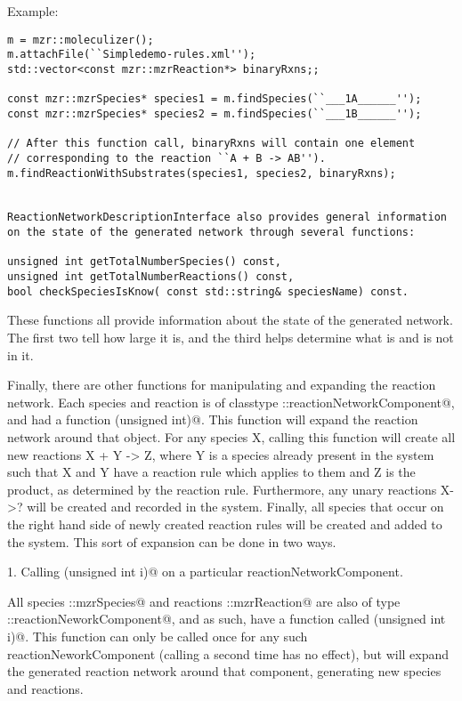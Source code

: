 Example:
\begin{lstlisting}
m = mzr::moleculizer();
m.attachFile(``Simpledemo-rules.xml'');
std::vector<const mzr::mzrReaction*> binaryRxns;;

const mzr::mzrSpecies* species1 = m.findSpecies(``___1A______'');
const mzr::mzrSpecies* species2 = m.findSpecies(``___1B______'');

// After this function call, binaryRxns will contain one element
// corresponding to the reaction ``A + B -> AB'').
m.findReactionWithSubstrates(species1, species2, binaryRxns);


ReactionNetworkDescriptionInterface also provides general information
on the state of the generated network through several functions:

unsigned int getTotalNumberSpecies() const, 
unsigned int getTotalNumberReactions() const,
bool checkSpeciesIsKnow( const std::string& speciesName) const.
\end{lstlisting}

These functions all provide information about the state of the
generated network.  The first two tell how large it is, and the third
helps determine what is and is not in it.  

Finally, there are other functions for manipulating and expanding the
reaction network.  Each species and reaction is of classtype
\lstinline@fnd::reactionNetworkComponent@, and had a function
\lstinline@expandReactionNetwork(unsigned int)@.  This function will expand the
reaction network around that object.  For any species X, calling this
function will create all new reactions X + Y -> Z, where Y is a species
already present in the system such that X and Y have a reaction rule
which applies to them and Z is the product, as determined by the
reaction rule.  Furthermore, any unary reactions X->? will be created
and recorded in the system.  Finally, all species that occur on the
right hand side of newly created reaction rules will be created and
added to the system.  This sort of expansion can be done in two ways.

1.  Calling \lstinline@expandReactionNetwork(unsigned int i)@ on a particular
reactionNetworkComponent.

All species \lstinline@mzr::mzrSpecies@ and reactions \lstinline@mzr::mzrReaction@ are
also of type \lstinline@fnd::reactionNeworkComponent@, and as such, have a function
called \lstinline@expandReactionNetwork(unsigned int i)@.  This function can only
be called once for any such reactionNeworkComponent (calling a second
time has no effect), but will expand the generated reaction network
around that component, generating new species and reactions.


